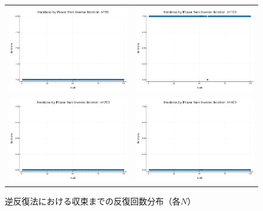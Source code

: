 \documentclass[a4paper,11pt]{ltjsarticle}
\begin{document}
\begin{figure}[H]
  \centering
  \begin{tabular}{cc}
    \includegraphics[width=72mm]{graphs/exp4_n50_iterations.png} &
    \includegraphics[width=72mm]{graphs/exp4_n100_iterations.png} \\
    \includegraphics[width=72mm]{graphs/exp4_n200_iterations.png} &
    \includegraphics[width=72mm]{graphs/exp4_n400_iterations.png} \\
  \end{tabular}
  \caption{逆反復法における収束までの反復回数分布（各$N$）}
  \label{fig:exp4_iterations}
\end{figure}
\end{document}
